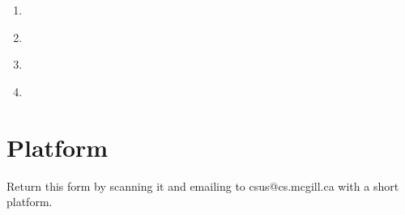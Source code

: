 \documentclass[fontsize=11]{scrartcl}
\begin{document}
\begin{Form}
\begin{center}
\begin{enumerate}
    	    \item \makebox[2in]{\hrulefill}  \makebox[1in]{\hrulefill}  \makebox[1in]{\hrulefill}  \\ 
    	    
    	    \item \makebox[2in]{\hrulefill}  \makebox[1in]{\hrulefill}  \makebox[1in]{\hrulefill}  \\ 
    	    
    	    \item \makebox[2in]{\hrulefill}  \makebox[1in]{\hrulefill}  \makebox[1in]{\hrulefill}  \\ 
    	    
    	    \item \makebox[2in]{\hrulefill}  \makebox[1in]{\hrulefill}  \makebox[1in]{\hrulefill}  \\ 

    	    
    \end{enumerate}
    
    \section*{Platform}
\end{center}
	\vfill
	
	\centering
	Return this form by scanning it and emailing to csus@cs.mcgill.ca with a short platform.
\end{Form}
\end{document}

